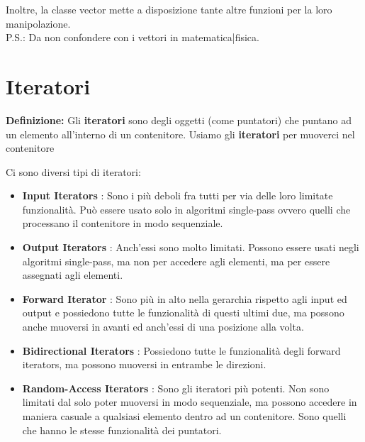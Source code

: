 \textsf{\small Inoltre, la classe vector mette a disposizione tante altre funzioni per la loro manipolazione.} \\

\textsf{\small P.S.: Da non confondere con i vettori in matematica|fisica.} \break


\newpage

\section{Iteratori}

\textsf{\small \textbf{Definizione: } Gli \textbf{iteratori} sono degli oggetti (come puntatori) che puntano ad un elemento all'interno di un contenitore. Usiamo gli \textbf{iteratori} per muoverci nel contenitore } \break

\textsf{\small Ci sono diversi tipi di iteratori: } \\

\begin{itemize}
	\item \textsf{\small \textbf{Input Iterators} : Sono i più deboli fra tutti per via delle loro limitate funzionalità. Può essere usato solo in algoritmi single-pass ovvero quelli che processano il contenitore in modo sequenziale.}
	\item \textsf{\small \textbf{Output Iterators} : Anch'essi sono molto limitati. Possono essere usati negli algoritmi single-pass, ma non per accedere agli elementi, ma per essere assegnati agli elementi.}
	\item \textsf{\small \textbf{Forward Iterator} : Sono più in alto nella gerarchia rispetto agli input ed output e possiedono tutte le funzionalità di questi ultimi due, ma possono anche muoversi in avanti ed anch'essi di una posizione alla volta.}
	\item \textsf{\small \textbf{Bidirectional Iterators} : Possiedono tutte le funzionalità degli forward iterators, ma possono muoversi in entrambe le direzioni.}
	\item \textsf{\small \textbf{Random-Access Iterators} : Sono gli iteratori più potenti. Non sono limitati dal solo poter muoversi in modo sequenziale, ma possono accedere in maniera casuale a qualsiasi elemento dentro ad un contenitore. Sono quelli che hanno le stesse funzionalità dei puntatori.}
\end{itemize}

